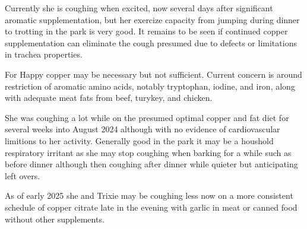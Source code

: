 {Currently
she is coughing when excited, now several days after   significant
aromatic supplementation, but her exercize capacity from
jumping during dinner to trotting in the park is very good.
It remains to be seen if continued copper supplementation can
eliminate the cough presumed due to defects or limitations in 
trachea properties.  

For Happy copper may be necessary but not sufficient. 
Current concern is around restriction of aromatic amino
acids, notably tryptophan, iodine, and iron, along with
adequate meat fats from beef, turykey, and chicken. 

She was coughing a lot while on the presumed optimal
copper and fat diet for several weeks into August
2024 although with no evidence of cardiovascular
limitions to her activity. Generally good in the park
it may be a houshold respiratory irritant  as she
may stop coughing when barking for a while  such as before
dinner although then coughing after dinner while quieter
but anticipating left overs. 

As of early 2025 she and Trixie  may be coughing less now on a more consistent
schedule of copper citrate late in the evening with garlic in meat or canned
food without other supplements. 



} %


\newcommand{\mjmtrixietext}
{
Trixie began coughing shortly after arrival and was
very low energy. Her coat was notable for a sticky
feeling that seemeed to recur after a bath.  
Many other dogs began to cough or
hack suggesting that she brought a communicable infectious
disease which was the motivation for increasing copper again. 
Nutrient mix was modified to add more copper and
most dogs' coughing returned to normal quanity and qualitiy
although her's did not entirely resolve. Copper stopped for a couple
day ( I was gone ) and owner took he to the vet as she
began coughing more. Clavamox was prescribed and her coughing
stopped within a few days. Her energy level has improved
but she did not  run until 2024-05-02 ( 19845 ) .  
She had a renwed cough around 2024-05-22 (19865)  subsequent to
copper withdrawl on 2024-05-15 (19858). 
Cough seems deep on excitement not honk/wheeze like Happy.
Copper resumed 2024-05-27 and is greatly reduced
by 2025-06-01 . 
She appeared more energetic than when I left and walked well
although maybe still tired at end of walk. 
Her coat now feels clean. 

Most recently she has been getting more complete supplementation
including tryptophan and tyrosine with iron and lipoicacid
and continues to gain energy. Coughing is very rare and her mobility
seems ok not hesitating as much to run or jump a little.  
Around December 2024 her cough seemed to return unless she
had copper garlic. By early January, her cough was greatly
decrased but still common although her attention
level continues to increase and right now the cough is thought
to be tolerable.

} %


